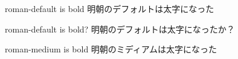\documentclass{article}
\begin{document}
roman-default is bold
明朝のデフォルトは太字になった

\normalfont %
roman-default is bold?
明朝のデフォルトは太字になったか？

\mdseries
roman-medium is bold
明朝のミディアムは太字になった
\end{document}
